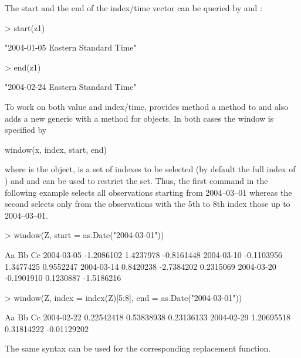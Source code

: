 \documentclass{Z}
\begin{document}
The start and the end of the index/time vector can be queried by
 and :
\begin{Schunk}
\begin{Sinput}
> start(z1)
\end{Sinput}
\begin{Soutput}
[1] "2004-01-05 Eastern Standard Time"
\end{Soutput}
\begin{Sinput}
> end(z1)
\end{Sinput}
\begin{Soutput}
[1] "2004-02-24 Eastern Standard Time"
\end{Soutput}
\end{Schunk}


To work on both value and index/time,  provides method
a method to  and also adds a new generic 
 with a method for  objects. In both
cases the window is specified by
\begin{Scode}
window(x, index, start, end)
\end{Scode}
where  is the  object,  is a set
of indexes to be selected (by default the full index of )
and  and  can be used to restrict the 
 set. Thus, the first command in the following example
selects all observations starting from 2004--03--01 whereas the
second selects only from the observations with the 5th to 8th index
those up to 2004--03--01.
\begin{Schunk}
\begin{Sinput}
> window(Z, start = as.Date("2004-03-01"))
\end{Sinput}
\begin{Soutput}
           Aa         Bb         Cc        
2004-03-05 -1.2086102  1.4237978 -0.8161448
2004-03-10 -0.1103956  1.3477425  0.9552247
2004-03-14  0.8420238 -2.7384202  0.2315069
2004-03-20 -0.1901910  0.1230887 -1.5186216
\end{Soutput}
\begin{Sinput}
> window(Z, index = index(Z)[5:8], end = as.Date("2004-03-01"))
\end{Sinput}
\begin{Soutput}
           Aa          Bb          Cc         
2004-02-22  0.22542418  0.53838938  0.23136133
2004-02-29  1.20695518  0.31814222 -0.01129202
\end{Soutput}
\end{Schunk}
The same syntax can be used for the corresponding replacement function.
\end{document}
